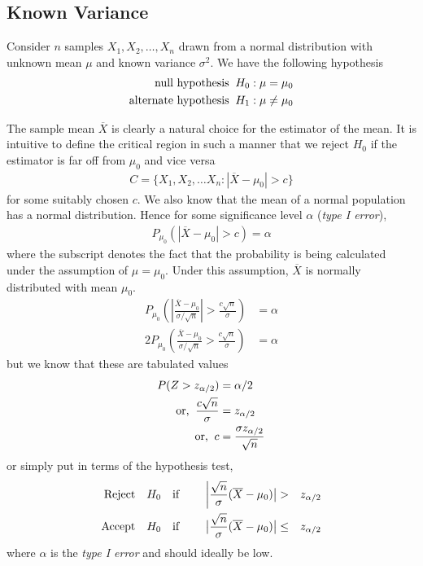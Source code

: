 \documentclass[../probability-notes.tex]{subfiles}
\begin{document}
    \subsection{Known Variance}\label{sec:mean_normal_known_variance}
    Consider $n$ samples $X_{1}, X_{2}, \ldots, X_{n}$ drawn from a normal distribution with unknown mean $\mu$ and known variance $\sigma^{2}$. We have the following hypothesis
    \begin{align*}
        \text{null hypothesis \:} H_{0}&: \mu = \mu_{0}\\
        \text{alternate hypothesis \:} H_{1}&: \mu \neq \mu_{0}
    \end{align*}

    The sample mean $\overline{X}$ is clearly a natural choice for the estimator of the mean. It is intuitive to define the critical region in such a manner that we reject $H_{0}$ if the estimator is far off from $\mu_{0}$ and vice versa
    \begin{align*}
        C = \{ X_{1}, X_{2}, \ldots X_{n}: |\overline{X} - \mu_{0}| > c\}
    \end{align*}
    for some suitably chosen $c$. We also know that the mean of a normal population has a normal distribution. Hence for some significance level $\alpha$ (\emph{type I error}),
    \begin{align*}
        P_{\mu_{0}}(|\overline{X} - \mu_{0}| > c) = \alpha
    \end{align*}
    where the subscript denotes the fact that the probability is being calculated under the assumption of $\mu = \mu_{0}$. Under this assumption, $\overline{X}$ is normally distributed with mean $\mu_{0}$.
    \begin{align*}
        P_{\mu_{0}}(|\frac{\overline{X} - \mu_{0}}{\sigma/\sqrt{n}}| > \frac{c\sqrt{n}}{\sigma}) &= \alpha\\
        2P_{\mu_{0}}(\frac{\overline{X} - \mu_{0}}{\sigma/\sqrt{n}} > \frac{c\sqrt{n}}{\sigma}) &= \alpha
    \end{align*}
    but we know that these are tabulated values
    \begin{align*}
        P(Z > z_{\alpha/2}) &= \alpha/2\\
        \text{or, \:} \frac{c\sqrt{n}}{\sigma} &= z_{\alpha/2}\\
        \text{or, \:} c &= \frac{\sigma z_{\alpha/2}}{\sqrt{n}}
    \end{align*}
    or simply put in terms of the hypothesis test,
    \begin{alignat*}{4}
        \text{Reject\quad} &H_{0} \text{\quad if \quad} &\bigg\lvert \frac{\sqrt{n}}{\sigma}(\overline{X} - \mu_{0}) \big\rvert &> &z_{\alpha/2}\\
        \text{Accept\quad} &H_{0} \text{\quad if\quad} &\big\lvert \frac{\sqrt{n}}{\sigma}(\overline{X} - \mu_{0}) \big\rvert &\leq &z_{\alpha/2}\\
    \end{alignat*}
    where $\alpha$ is the \emph{type I error} and should ideally be low.
\end{document}
